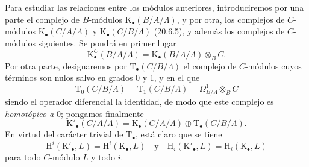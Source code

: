 \begin{env}[20.6.15]
\label{0.20.6.15-fr}
Para estudiar las relaciones entre los módulos anteriores, introduciremos
por una parte el complejo de $B$-módulos
$\mathrm{K}_\bullet(B/A/\Lambda)$, y por otra, los complejos
de $C$-módulos $\mathrm{K}_\bullet(C/A/\Lambda)$ y
$\mathrm{K}_\bullet(C/B/\Lambda)$ (20.6.5), y además los complejos de
$C$-módulos siguientes. Se pondrá en primer lugar
\begin{equation}
\tag{20.6.15.1}
\label{0.20.6.15.1-fr}
  \mathrm{K}^C_\bullet(B/A/\Lambda)=
  \mathrm{K}_\bullet(B/A/\Lambda)\otimes_B C.
\end{equation}
Por otra parte, designaremos por $\mathrm{T}_\bullet(C/B/\Lambda)$ el
complejo de $C$-módulos cuyos términos son nulos salvo en grados 0 y 1,
y en el que
\begin{equation}
\tag{20.6.15.2}
\label{0.20.6.15.2-fr}
  \mathrm{T}_0(C/B/\Lambda)=\mathrm{T}_1(C/B/\Lambda)=
  \Omega^1_{B/\Lambda}\otimes_B C
\end{equation}
siendo el operador diferencial la identidad, de modo que este complejo es
\emph{homotópico a} 0; pongamos finalmente
\begin{equation}
\tag{20.6.15.3}
\label{0.20.6.15.3-fr}
  \mathrm{K}'_\bullet(C/A/\Lambda)=
  \mathrm{K}_\bullet(C/A/\Lambda)\oplus
  \mathrm{T}_\bullet(C/B/\Lambda).
\end{equation}
En virtud del carácter trivial de $\mathrm{T}_\bullet$, está claro que
se tiene
\begin{equation}
\tag{20.6.15.4}
\label{0.20.6.15.4-fr}
  \mathrm{H}^i(\mathrm{K}'_\bullet,L)=
  \mathrm{H}^i(\mathrm{K}_\bullet,L)
  \quad\text{y}\quad
  \mathrm{H}_i(\mathrm{K}'_\bullet,L)=
  \mathrm{H}_i(\mathrm{K}_\bullet,L)
\end{equation}
para todo $C$-módulo $L$ y todo $i$.
\end{env}
